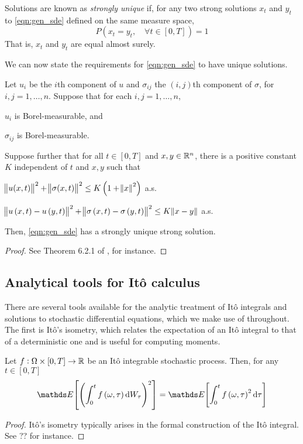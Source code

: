 Solutions are known as \emph{strongly unique} if, for any two strong solutions \(x_t\) and \(y_t\) to \eqref{eqn:gen_sde} defined on the same measure space,
\[
	P\left(x_t = y_t, \quad \forall t \in \left[0,T\right]\right) = 1
\]
That is, \(x_t\) and \(y_t\) are equal almost surely.

We can now state the requirements for \eqref{eqn:gen_sde} to have unique solutions.
\begin{theorem}
	Let \(u_i\) be the \(i\)th component of \(u\) and \(\sigma_{ij}\) the \((i,j)\)th component of \(\sigma\), for \(i,j = 1,\hdots,n\).
	Suppose that for each \(i,j = 1,\hdots,n\),
	\begin{romanate}
		\item \(u_i\) is Borel-measurable, and
		\item \(\sigma_{ij}\) is Borel-measurable.
	\end{romanate}
	Suppose further that for all \(t \in [0,T]\) and \(x,y \in \mathbb{R}^n\), there is a positive constant \(K\) independent of \(t\) and \(x, y\) such that
	\begin{romanate}
		\setcounter{enumi}{2}
		\item \(\norm{u(x,t)}^2 + \norm{\sigma(x,t)}^2 \leq K\left(1 + \norm{x}^2\right)\) a.s.
		\item \(\norm{u\left(x,t\right) - u\left(y,t\right)}^2 + \norm{\sigma\left(x,t\right) - \sigma\left(y,t\right)}^2 \leq K\norm{x - y}\) a.s.
	\end{romanate}
	Then, \eqref{eqn:gen_sde} has a strongly unique strong solution.
\end{theorem}
\begin{proof}
	See Theorem 6.2.1 of \cite{KallianpurSundar_2014_StochasticAnalysisDiffusion}, for instance.
\end{proof}



\subsection{Analytical tools for It\^o calculus}
There are several tools available for the analytic treatment of It\^o integrals and solutions to stochastic differential equations, which we make use of throughout.
The first is It\^o's isometry, which relates the expectation of an It\^o integral to that of a deterministic one and is useful for computing moments. 
\begin{theorem}[It\^o's Isometry]\label{thm:ito_isom}
	Let \(f: \Omega \times [0,T] \to \mathbb{R}\) be an It\^o integrable stochastic process. 
	Then, for any \(t \in [0,T]\)
	\[
		\avg{\left(\int_0^t{f\left(\omega, \tau\right)\dif W_\tau}\right)^2} = \avg{\int_0^t{f\left(\omega, \tau\right)^2\dif\tau}}
	\]
\end{theorem}
\begin{proof}
	It\^o's isometry typically arises in the formal construction of the It\^o integral. 
	See ?? for instance.
\end{proof}

